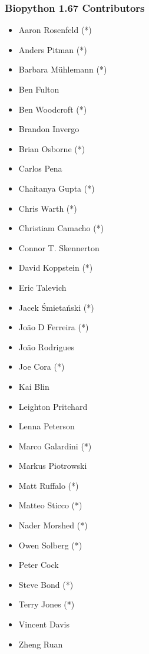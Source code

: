 \documentclass[trans]{beamer}
\begin{document}
\frame
{
  \frametitle{Biopython 1.67 Contributors}

  \scriptsize{
  \begin{multicols}{2}
  \begin{itemize}
  \item Aaron Rosenfeld (*)
  \item Anders Pitman (*)
  \item Barbara Mühlemann (*)
  \item Ben Fulton
  \item Ben Woodcroft (*)
  \item Brandon Invergo
  \item Brian Osborne (*)
  \item Carlos Pena
  \item Chaitanya Gupta (*)
  \item Chris Warth (*)
  \item Christiam Camacho (*)
  \item Connor T. Skennerton
  \item David Koppstein (*)
  \item Eric Talevich
  \item Jacek Śmietański (*)
  \item João D Ferreira (*)
  \item João Rodrigues
  \item Joe Cora (*)
  \item Kai Blin
  \item Leighton Pritchard
  \item Lenna Peterson
  \item Marco Galardini (*)
  \item Markus Piotrowski
  \item Matt Ruffalo (*)
  \item Matteo Sticco (*)
  \item Nader Morshed (*)
  \item Owen Solberg (*)
  \item Peter Cock
  \item Steve Bond (*)
  \item Terry Jones (*)
  \item Vincent Davis
  \item Zheng Ruan
  \end{itemize}
  \end{multicols}
  }
}
\end{document}
